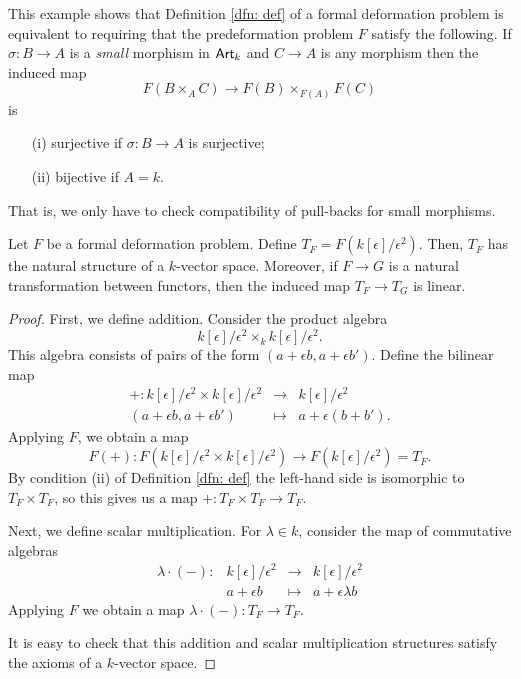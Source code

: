 \documentclass[11pt]{amsart}
\begin{document}
\begin{rmk}
This example shows that Definition \ref{dfn: def} of a formal deformation problem is equivalent to requiring that the predeformation problem $F$ satisfy the following. 
If $\sigma : B \to A$ is a {\em small} morphism in ${\sf Art}_k$ and $C \to A$ is any morphism then the induced map
\[
F(B \times_A C) \to F(B) \times_{F(A)} F(C)
\]
is
\begin{enumerate}
\item[(i)] surjective if $\sigma : B \to A$ is surjective;
\item[(ii)] bijective if $A = k$.
\end{enumerate}
That is, we only have to check compatibility of pull-backs for small morphisms. 
\end{rmk}

\begin{prop} Let $F$ be a formal deformation problem. 
Define $T_F = F(k[\epsilon]/\epsilon^2)$. 
Then, $T_F$ has the natural structure of a $k$-vector space. 
Moreover, if $F \to G$ is a natural transformation between functors, then the induced map $T_F \to T_G$ is linear. 
\end{prop}
\begin{proof}
First, we define addition.
Consider the product algebra
\[
k[\epsilon]/\epsilon^2 \times_k k[\epsilon]/\epsilon^2 .
\]
This algebra consists of pairs of the form $(a + \epsilon b, a + \epsilon b')$. 
Define the bilinear map
\[
\begin{array}{cccc}
+ : k[\epsilon]/\epsilon^2 \times k[\epsilon]/\epsilon^2 & \to & k[\epsilon]/\epsilon^2 \\
(a + \epsilon b, a+ \epsilon b') & \mapsto & a + \epsilon (b + b') .
\end{array}
\]
Applying $F$, we obtain a map
\[
F(+) : F\left(k[\epsilon]/\epsilon^2 \times k[\epsilon]/\epsilon^2\right) \to F\left(k[\epsilon]/\epsilon^2\right) = T_F .
\]
By condition (ii) of Definition \ref{dfn: def} the left-hand side is isomorphic to $T_F \times T_F$, so this gives us a map $+ : T_F \times T_F \to T_F$. 

Next, we define scalar multiplication. 
For $\lambda \in k$, consider the map of commutative algebras
\[
\begin{array}{cccc}
\lambda \cdot (-) : & k[\epsilon]/\epsilon^2 & \to & k[\epsilon]/\epsilon^2 \\
& a + \epsilon b & \mapsto & a + \epsilon \lambda b
\end{array}
\]
Applying $F$ we obtain a map $\lambda \cdot (-) : T_F \to T_F$. 

It is easy to check that this addition and scalar multiplication structures satisfy the axioms of a $k$-vector space. 
\end{proof}
\end{document}
